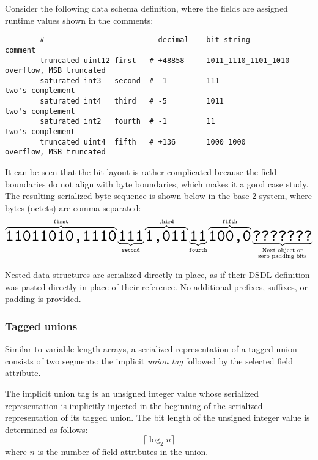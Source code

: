 \begin{remark}
    Consider the following data schema definition,
    where the fields are assigned runtime values shown in the comments:

    \begin{verbatim}
        #                          decimal    bit string            comment
        truncated uint12 first   # +48858     1011_1110_1101_1010   overflow, MSB truncated
        saturated int3   second  # -1         111                   two's complement
        saturated int4   third   # -5         1011                  two's complement
        saturated int2   fourth  # -1         11                    two's complement
        truncated uint4  fifth   # +136       1000_1000             overflow, MSB truncated
    \end{verbatim}

    It can be seen that the bit layout is rather complicated because the field boundaries do not align with byte
    boundaries, which makes it a good case study.
    The resulting serialized byte sequence is shown below in the base-2 system,
    where bytes (octets) are comma-separated:
    $$
        \overbrace{\hugett{11011010,1110}}^{\texttt{first}}%
        \underbrace{\hugett{111}}_{\texttt{second}}%
        \overbrace{\hugett{1,011}}^{\texttt{third}}%
        \underbrace{\hugett{11}}_{\texttt{fourth}}%
        \overbrace{\hugett{100,0}}^{\texttt{fifth}}%
        \underbrace{\hugett{???????}}_{\substack{\text{Next object or} \\ \text{zero padding bits}}}
    $$
\end{remark}

Nested data structures are serialized directly in-place,
as if their DSDL definition was pasted directly in place of their reference.
No additional prefixes, suffixes, or padding is provided.

\subsubsection{Tagged unions}

Similar to variable-length arrays, a serialized representation of a tagged union consists of two segments:
the implicit \emph{union tag} followed by the selected field attribute.

The implicit union tag is an unsigned integer value whose serialized representation
is implicitly injected in the beginning of the serialized representation of its tagged union.
The bit length of the unsigned integer value is determined as follows:
$$\lceil{}\log_2 n\rceil{}$$
where $n$ is the number of field attributes in the union.

